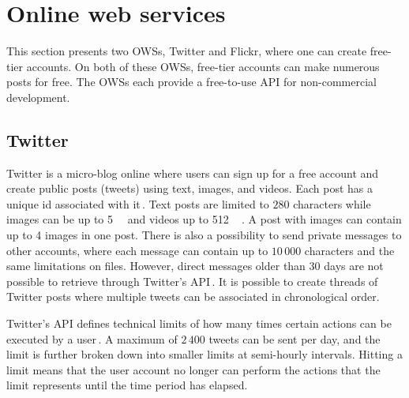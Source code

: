 \section{Online web services}
\label{sec:ows}
This section presents two \gls{OWS}s, Twitter and Flickr, where one can create free-tier accounts. On both of these \gls{OWS}s, free-tier accounts can make numerous posts for free. The \gls{OWS}s each provide a free-to-use \gls{API} for non-commercial development. 

\subsection{Twitter}
\label{subsec:ows_twitter}
Twitter is a micro-blog online where users can sign up for a free account and create public posts (tweets) using text, images, and videos. Each post has a unique id associated with it\,\cite{twitterTwitterIDs}. Text posts are limited to $280$ characters while images can be up to \SI{5}{\mega\byte} and videos up to \SI{512}{\mega\byte}\,\cite{MediaBestPractices}. A post with images can contain up to 4 images in one post. There is also a possibility to send private messages to other accounts, where each message can contain up to $10\,000$ characters and the same limitations on files. However, direct messages older than $30$ days are not possible to retrieve through Twitter's \gls{API}\,\cite{RetrievingOlder302018}. It is possible to create threads of Twitter posts where multiple tweets can be associated in chronological order.

Twitter's \gls{API} defines technical limits of how many times certain actions can be executed by a user\,\cite{UnderstandingTwitterLimits}. A maximum of $2\,400$ tweets can be sent per day, and the limit is further broken down into smaller limits at semi-hourly intervals. Hitting a limit means that the user account no longer can perform the actions that the limit represents until the time period has elapsed.

